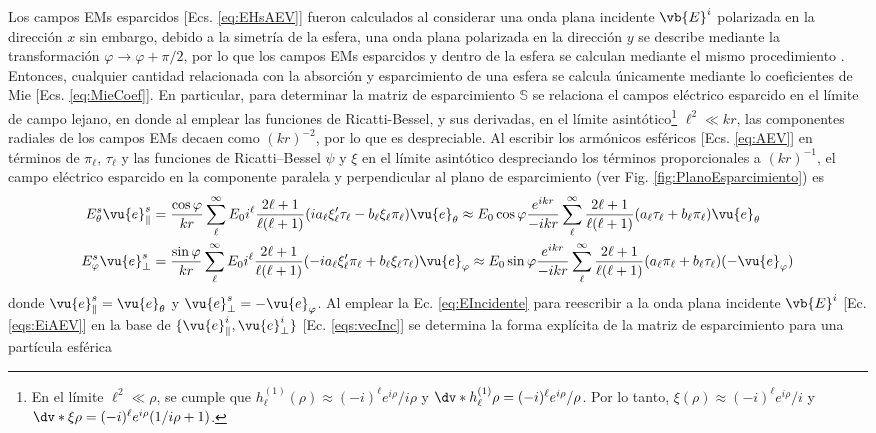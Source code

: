 Los campos EMs esparcidos [Ecs. \eqref{eq:EHsAEV}] fueron calculados al considerar una onda plana incidente $\vb{E}^i$ polarizada en la dirección $x$ sin embargo, debido a la simetría de la esfera, una onda plana polarizada en la dirección $y$ se describe mediante la transformación $\varphi\to\varphi+\pi/2$, por lo que los campos EMs esparcidos y dentro de la esfera se calculan mediante el mismo procedimiento \cite{bohren1998absorption}. Entonces, cualquier cantidad relacionada con la absorción y esparcimiento de una esfera se calcula únicamente mediante lo coeficientes de Mie [Ecs. \eqref{eq:MieCoef}]. En particular, para determinar la matriz de esparcimiento $\mathbb{S}$ se relaciona el campos eléctrico esparcido en el límite de campo lejano, en donde al emplear las funciones de Ricatti-Bessel, y sus derivadas, en el límite asintótico\footnote{En el límite $\ell^2 \ll \rho$, se cumple que $h_\ell^{(1)}(\rho)\approx (-i)^\ell e^{i\rho}/i\rho$ y $\dv*{h_\ell^{(1)}}{\rho} = (-i)^\ell e^{i\rho}/\rho$. Por lo tanto,  $\xi(\rho)\approx (-i)^\ell e^{i\rho}/i$ y $\dv*{\xi}{\rho} = (-i)^\ell e^{i\rho}(1/i\rho + 1)$.} $\ell^2 \ll kr$, las componentes radiales de los campos EMs decaen como $(kr)^{-2}$, por lo que es despreciable. Al escribir los armónicos esféricos  [Ecs. \eqref{eq:AEV}] en términos de $\pi_\ell$, $\tau_\ell$ y las funciones de Ricatti--Bessel $\psi$ y $\xi$ en el límite asintótico despreciando los términos proporcionales a $(kr)^{-1}$, el campo eléctrico esparcido en la componente paralela y perpendicular al plano de esparcimiento (ver Fig. \ref{fig:PlanoEsparcimiento}) es
	\begin{align*}
	E_\theta^s \vu{e}_\parallel^s &=\frac{\cos\varphi}{kr}
								\sum_\ell^\infty E_0i^\ell\frac{2\ell+1}{\ell(\ell+1)}
						(i a_\ell\xi_\ell'\tau_\ell-b_\ell\xi_\ell\pi_\ell)\vu{e}_\theta
			\approx E_0\cos\varphi\frac{e^{ikr}}{-ikr}\sum_\ell^\infty\frac{2\ell+1}{\ell(\ell+1)}
				( a_\ell \tau_\ell + b_\ell\pi_\ell )\vu{e}_\theta \\
		E_\varphi^s \vu{e}_\perp^s &= \frac{\sin\varphi}{kr}
							\sum_\ell^\infty E_0i^\ell\frac{2\ell+1}{\ell(\ell+1)}						
							(-ia_\ell\xi_\ell'\pi_\ell+b_\ell\xi_\ell\tau_\ell)\vu{e}_\varphi 
			\approx E_0\sin\varphi\frac{e^{ikr}}{-ikr}\sum_\ell^\infty\frac{2\ell+1}{\ell(\ell+1)}					(a_\ell\pi_\ell+b_\ell\tau_\ell)(-\vu{e}_\varphi)
	\end{align*}
donde $\vu{e}_\parallel^s =\vu{e}_\theta$ y $\vu{e}_\perp^s=-\vu{e}_\varphi$. Al emplear la Ec. \eqref{eq:EIncidente} para reescribir a la onda plana incidente $\vb{E}^i$ [Ec. \eqref{eqs:EiAEV}] en la base de $\{\vu{e}_\parallel^i,\vu{e}_\perp^i\}$ [Ec. \eqref{eqs:vecInc}] se determina la forma explícita de la matriz de esparcimiento para una partícula esférica\vspace*{-.75em} 
